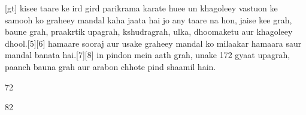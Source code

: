 \documentclass{article}
\begin{document}
[gt] kisee taare ke ird gird parikrama karate huee un khagoleey vastuon ke samooh ko graheey mandal kaha jaata hai jo any taare na hon, jaise kee grah, baune grah, praakrtik upagrah, kshudragrah, ulka, dhoomaketu aur khagoleey dhool.[5][6] hamaare sooraj aur usake graheey mandal ko milaakar hamaara saur mandal banata hai.[7][8] in pindon mein aath grah, unake 172 gyaat upagrah, paanch bauna grah aur arabon chhote pind shaamil hain.


72 


82 

\end{document}
